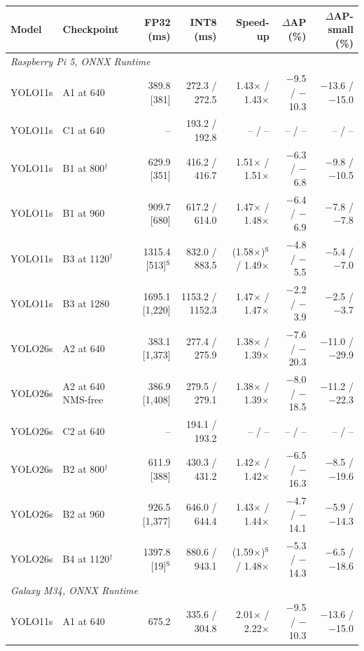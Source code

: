 \begin{tabular}{llrrrrr}
\toprule
Model & Checkpoint & FP32 (ms) & INT8 (ms) & Speed-up & $\Delta$AP (\%) & $\Delta$AP-small (\%) \\
\midrule
\multicolumn{7}{l}{\textit{Raspberry Pi 5, ONNX Runtime}} \\
YOLO11s & A1 at 640 & 389.8 [381] & 272.3 / 272.5 & 1.43$\times$ / 1.43$\times$ & $-$9.5 / $-$10.3 & $-$13.6 / $-$15.0 \\
YOLO11s & C1 at 640 & -- & 193.2 / 192.8 & -- / -- & -- / -- & -- / -- \\
YOLO11s & B1 at 800$^{\dagger}$ & 629.9 [351] & 416.2 / 416.7 & 1.51$\times$ / 1.51$\times$ & $-$6.3 / $-$6.8 & $-$9.8 / $-$10.5 \\
YOLO11s & B1 at 960 & 909.7 [680] & 617.2 / 614.0 & 1.47$\times$ / 1.48$\times$ & $-$6.4 / $-$6.9 & $-$7.8 / $-$7.8 \\
YOLO11s & B3 at 1120$^{\dagger}$ & 1315.4 [513]$^{\mathrm{S}}$ & 832.0 / 883.5 & (1.58$\times$)$^{\mathrm{S}}$ / 1.49$\times$ & $-$4.8 / $-$5.5 & $-$5.4 / $-$7.0 \\
YOLO11s & B3 at 1280 & 1695.1 [1{,}220] & 1153.2 / 1152.3 & 1.47$\times$ / 1.47$\times$ & $-$2.2 / $-$3.9 & $-$2.5 / $-$3.7 \\
YOLO26s & A2 at 640 & 383.1 [1{,}373] & 277.4 / 275.9 & 1.38$\times$ / 1.39$\times$ & $-$7.6 / $-$20.3 & $-$11.0 / $-$29.9 \\
YOLO26s & A2 at 640 NMS-free & 386.9 [1{,}408] & 279.5 / 279.1 & 1.38$\times$ / 1.39$\times$ & $-$8.0 / $-$18.5 & $-$11.2 / $-$22.3 \\
YOLO26s & C2 at 640 & -- & 194.1 / 193.2 & -- / -- & -- / -- & -- / -- \\
YOLO26s & B2 at 800$^{\dagger}$ & 611.9 [388] & 430.3 / 431.2 & 1.42$\times$ / 1.42$\times$ & $-$6.5 / $-$16.3 & $-$8.5 / $-$19.6 \\
YOLO26s & B2 at 960 & 926.5 [1{,}377] & 646.0 / 644.4 & 1.43$\times$ / 1.44$\times$ & $-$4.7 / $-$14.1 & $-$5.9 / $-$14.3 \\
YOLO26s & B4 at 1120$^{\dagger}$ & 1397.8 [19]$^{\mathrm{S}}$ & 880.6 / 943.1 & (1.59$\times$)$^{\mathrm{S}}$ / 1.48$\times$ & $-$5.3 / $-$14.3 & $-$6.5 / $-$18.6 \\
\midrule
\multicolumn{7}{l}{\textit{Galaxy M34, ONNX Runtime}} \\
YOLO11s & A1 at 640 & 675.2 & 335.6 / 304.8 & 2.01$\times$ / 2.22$\times$ & $-$9.5 / $-$10.3 & $-$13.6 / $-$15.0 \\

\end{tabular}
